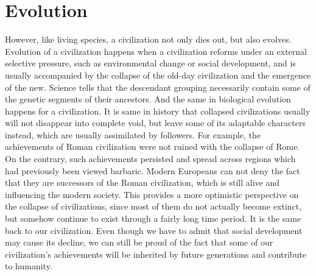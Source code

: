 \documentclass[a4paper,12pt]{article}
\begin{document}
    \section{Evolution}
    However, like living species, a civilization not only dies out, but also evolves.
    Evolution of a civilization happens when a civilization reforms under an external selective pressure, such as environmental change or social development, and is usually accompanied by the collapse of the old-day civilization and the emergence of the new.
    Science tells that the descendant grouping necessarily contain some of the genetic segments of their ancestors.
    And the same in biological evolution happens for a civilization.
    It is same in history that collapsed civilizations usually will not disappear into complete void, but leave some of its adaptable characters instead, which are usually assimilated by followers.
    For example, the achievements of Roman civilization were not ruined with the collapse of Rome.
    On the contrary, such achievements persisted and spread across regions which had previously been viewed barbaric.
    Modern Europeans can not deny the fact that they are successors of the Roman civilization, which is still alive and influencing the modern society.
    This provides a more optimistic perspective on the collapse of civilizations, since most of them do not actually become extinct, but somehow continue to exist through a fairly long time period.
    It is the same back to our civilization.
    Even though we have to admit that social development may cause its decline, we can still be proud of the fact that some of our civilization's achievements will be inherited by future generations and contribute to humanity.
    
    
\end{document}
